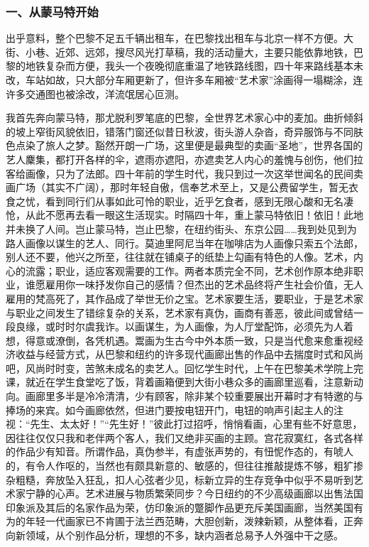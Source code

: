 \documentclass{article}
\begin{document}
\subsubsection{一、从蒙马特开始}
出乎意料，整个巴黎不足五千辆出租车，在巴黎找出租车与北京一样不方便。大街、小巷、近郊、远郊，搜尽风光打草稿，我的活动量大，主要只能依靠地铁，巴黎的地铁复杂而方便，我头一个夜晚彻底重温了地铁路线图，四十年来路线基本未改，车站如故，只大部分车厢更新了，但许多车厢被“艺术家”涂画得一塌糊涂，连许多交通图也被涂改，洋流氓居心叵测。

我首先奔向蒙马特，那尤脱利罗笔底的巴黎，全世界艺术家心中的麦加。曲折倾斜的坡上窄街风貌依旧，错落门窗还似昔日秋波，街头游人杂沓，奇异服饰与不同肤色点染了旅人之梦。豁然开朗一广场，这里便是最典型的卖画“圣地”，世界各国的艺人麇集，都打开各样的伞，遮雨亦遮阳，亦遮卖艺人内心的羞愧与创伤，他们拉客给画像，只为了法郎。四十年前的学生时代，我只到过一次这举世闻名的民间卖画广场（其实不广阔），那时年轻自傲，信奉艺术至上，又是公费留学生，暂无衣食之忧，看到同行们从事如此可怜的职业，近乎乞食者，感到无限心酸和无名凄怆，从此不愿再去看一眼这生活现实。时隔四十年，重上蒙马特依旧！依旧！此地并未换了人间。岂止蒙马特，岂止巴黎，在纽约街头、东京公园……我到处见到为路人画像以谋生的艺人、同行。莫迪里阿尼当年在咖啡店为人画像只索五个法郎，别人还不要，他兴之所至，往往就在铺桌子的纸垫上勾画有特色的人像。艺术，内心的流露；职业，适应客观需要的工作。两者本质完全不同，艺术创作原本绝非职业，谁愿雇用你一味抒发你自己的感情？但杰出的艺术品终将产生社会价值，无人雇用的梵高死了，其作品成了举世无价之宝。艺术家要生活，要职业，于是艺术家与职业之间发生了错综复杂的关系，艺术家有真伪，画商有善恶，彼此间或曾结一段良缘，或时时尔虞我诈。以画谋生，为人画像，为人厅堂配饰，必须先为人着想，得意或潦倒，各凭机遇。鬻画为生古今中外本质一致，只是当代愈来愈重视经济收益与经营方式，从巴黎和纽约的许多现代画廊出售的作品中去揣度时式和风尚吧，风尚时时变，苦煞未成名的卖艺人。回忆学生时代，上午在巴黎美术学院上完课，就近在学生食堂吃了饭，背着画箱便到大街小巷众多的画廊里巡看，注意新动向。画廊里多半是冷冷清清，少有顾客，除非某个较重要展出开幕时才有特邀的与捧场的来宾。如今画廊依然，但进门要按电钮开门，电钮的响声引起主人的注视：“先生、太太好！”“先生好！”彼此打过招呼，悄悄看画，心里有些不好意思，因往往仅仅只我和老伴两个客人，我们又绝非买画的主顾。宫花寂寞红，各式各样的作品少有知音。所谓作品，真伪参半，有虚张声势的，有忸怩作态的，有唬人的，有令人作呕的，当然也有颇具新意的、敏感的，但往往推敲提炼不够，粗犷掺杂粗糙，奔放坠入狂乱，扣人心弦者少见，标新立异的生存竞争中似乎不易听到艺术家宁静的心声。艺术进展与物质繁荣同步？今日纽约的不少高级画廊以出售法国印象派及其后的名家作品为荣，仿印象派的蹩脚作品更充斥美国画廊，当然美国有为的年轻一代画家已不肯圃于法兰西范畴，大胆创新，泼辣新颖，从整体看，正奔向新领域，从个别作品分析，理想的不多，缺内涵者总易予人外强中干之感。
\end{document}
